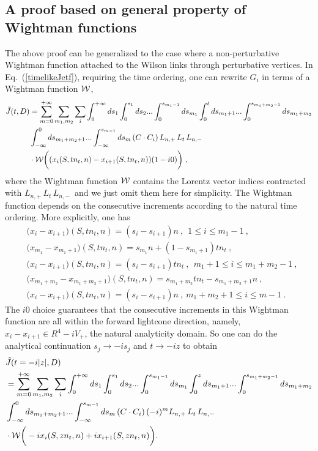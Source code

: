 \documentclass[a4paper,11pt]{article}
\begin{document}
\subsection{A proof based on general property of Wightman functions}
The above proof can be generalized to the case where a non-perturbative Wightman function attached to the Wilson links through perturbative vertices. In Eq.~(\ref{timelikeJetf}), requiring the time ordering, one can rewrite $G_i$ in terms of a Wightman function ${\cal W}$,
\begin{align}
\tilde J(t,D)&=\sum_{m=0}^{+\infty} \sum_{m_1,m_2} \sum_{i} \int^{+ \infty}_{0} d s_1 \int^{s_1}_{0} d s_2 ... \int^{s_{m_1-1}}_{0} d s_{m_1} 
\int^{t}_{0} d s_{m_1+1} ... \int^{s_{m_1+m_2-1}}_{0} d s_{m_1+m_2} \nonumber\\
&\int^{0}_{-\infty} d s_{m_1+m_2+1} ... \int^{s_{m-1}}_{-\infty} d s_{m}
\left(C \cdot C_{i}\right)L_{n,+}\, L_{t} \, L_{n,-}\nonumber \\ 
&\cdot{\cal W}\bigg((x_{i}(S,tn_t,n)-x_{i+1}(S,tn_t,n))(1-i0)\bigg) \ ,
\end{align}
where the Wightman function ${\cal W}$ contains the Lorentz vector indices contracted with $L_{n,+}\, L_{t} \, L_{n,-} \,$ and we just omit them here for simplicity.  The Wightman function depends on the consecutive increments according to the natural time ordering. More explicitly, one has
\begin{align}
&\bigg(x_{i}-x_{i+1}\bigg)(S,tn_t,n)=(s_i-s_{i+1})n \ , \ \ 1\le i\le m_1-1 \ , \\
&\bigg(x_{m_1}-x_{m_1+1}\bigg)(S,tn_t,n)=s_{m_1}n+(1-s_{m_{1}+1})tn_t \ , \\
&\bigg(x_{i}-x_{i+1}\bigg)(S,tn_t,n)=(s_i-s_{i+1})tn_t\ ,  \ \ m_1+1\le i\le m_1+m_2-1 \ , \\
&\bigg(x_{m_1+m_2}-x_{m_1+m_2+1}\bigg)(S,tn_t,n)=s_{m_1+m_2}tn_t-s_{m_1+m_2+1}n\ , \\
&\bigg(x_{i}-x_{i+1}\bigg)(S,tn_t,n)=(s_i-s_{i+1})n \ , \ m_1+m_2+1\le i\le m-1 \ .
\end{align}
The $i0$ choice guarantees that the consecutive increments in this Wightman function are all within the forward lightcone direction, namely, $x_{i}-x_{i+1} \in R^4-iV_+ $, the natural analyticity domain. So one can do the analytical continuation $s_j \rightarrow -i s_j$ and $t \rightarrow -i z$ to obtain
\begin{align}\label{eq:tlJetAC}
&\tilde J(t=-i|z|,D)\nonumber\\
&=\sum_{m=0}^{+\infty} \sum_{m_1,m_2} \sum_{i} \int^{+ \infty}_{0} d s_1 \int^{s_1}_{0} d s_2 ... \int^{s_{m_1-1}}_{0} d s_{m_1} 
\int^{z}_{0} d s_{m_1+1} ... \int^{s_{m_1+m_2-1}}_{0} d s_{m_1+m_2} \nonumber\\
&\int^{0}_{-\infty} d s_{m_1+m_2+1} ... \int^{s_{m-1}}_{-\infty} d s_{m}
\left(C \cdot C_{i}\right) (-i)^{m}L_{n,+}\, L_{t} \, L_{n,-} \nonumber \\ 
&\cdot
{\cal W}\bigg(-ix_i(S,zn_t,n)+ix_{i+1}(S,zn_t,n)\bigg).
\end{align}
\end{document}
